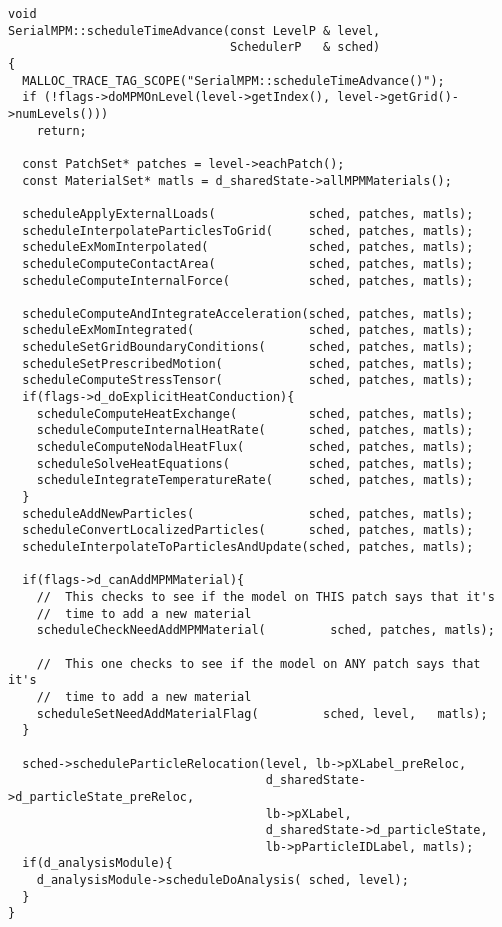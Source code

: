 \begin{Verbatim}[fontsize=\footnotesize]
void
SerialMPM::scheduleTimeAdvance(const LevelP & level,
                               SchedulerP   & sched)
{
  MALLOC_TRACE_TAG_SCOPE("SerialMPM::scheduleTimeAdvance()");
  if (!flags->doMPMOnLevel(level->getIndex(), level->getGrid()->numLevels()))
    return;

  const PatchSet* patches = level->eachPatch();
  const MaterialSet* matls = d_sharedState->allMPMMaterials();

  scheduleApplyExternalLoads(             sched, patches, matls);
  scheduleInterpolateParticlesToGrid(     sched, patches, matls);
  scheduleExMomInterpolated(              sched, patches, matls);
  scheduleComputeContactArea(             sched, patches, matls);
  scheduleComputeInternalForce(           sched, patches, matls);

  scheduleComputeAndIntegrateAcceleration(sched, patches, matls);
  scheduleExMomIntegrated(                sched, patches, matls);
  scheduleSetGridBoundaryConditions(      sched, patches, matls);
  scheduleSetPrescribedMotion(            sched, patches, matls);
  scheduleComputeStressTensor(            sched, patches, matls);
  if(flags->d_doExplicitHeatConduction){
    scheduleComputeHeatExchange(          sched, patches, matls);
    scheduleComputeInternalHeatRate(      sched, patches, matls);
    scheduleComputeNodalHeatFlux(         sched, patches, matls);
    scheduleSolveHeatEquations(           sched, patches, matls);
    scheduleIntegrateTemperatureRate(     sched, patches, matls);
  }
  scheduleAddNewParticles(                sched, patches, matls);
  scheduleConvertLocalizedParticles(      sched, patches, matls);
  scheduleInterpolateToParticlesAndUpdate(sched, patches, matls);

  if(flags->d_canAddMPMMaterial){
    //  This checks to see if the model on THIS patch says that it's
    //  time to add a new material
    scheduleCheckNeedAddMPMMaterial(         sched, patches, matls);

    //  This one checks to see if the model on ANY patch says that it's
    //  time to add a new material
    scheduleSetNeedAddMaterialFlag(         sched, level,   matls);
  }

  sched->scheduleParticleRelocation(level, lb->pXLabel_preReloc,
                                    d_sharedState->d_particleState_preReloc,
                                    lb->pXLabel,
                                    d_sharedState->d_particleState,
                                    lb->pParticleIDLabel, matls);
  if(d_analysisModule){
    d_analysisModule->scheduleDoAnalysis( sched, level);
  }
}
\end{Verbatim}

